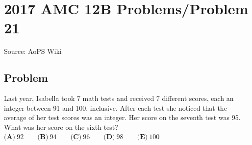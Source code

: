\documentclass[12pt]{article}
\begin{document}
\section*{{2017 AMC 12B Problems/Problem 21}}
Source: AoPS Wiki

\subsection*{Problem}
Last year, Isabella took 7 math tests and received 7 different scores, each an integer between 91 and 100, inclusive. After each test she noticed that the average of her test scores was an integer. Her score on the seventh test was 95. What was her score on the sixth test? $\textbf{(A)}\ 92\qquad\textbf{(B)}\ 94\qquad\textbf{(C)}\ 96\qquad\textbf{(D)}\ 98\qquad\textbf{(E)}\ 100$
\end{document}
